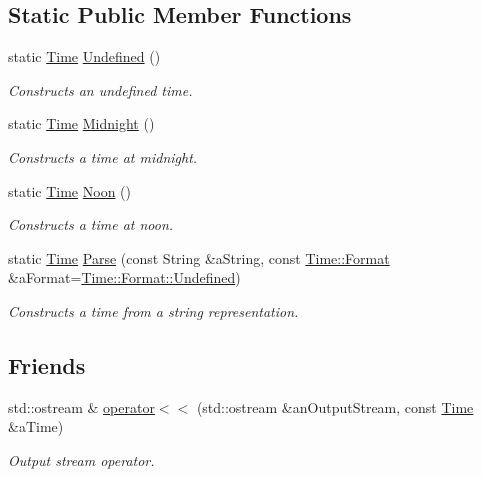 \subsection*{Static Public Member Functions}
\begin{DoxyCompactItemize}
\item 
static \hyperlink{classlibrary_1_1physics_1_1time_1_1_time}{Time} \hyperlink{classlibrary_1_1physics_1_1time_1_1_time_a6e8c7e4ea2d05a7c0a9e5e045ef45520}{Undefined} ()
\begin{DoxyCompactList}\small\item\em Constructs an undefined time. \end{DoxyCompactList}\item 
static \hyperlink{classlibrary_1_1physics_1_1time_1_1_time}{Time} \hyperlink{classlibrary_1_1physics_1_1time_1_1_time_a03dac8a95c9e8f64ef98c5370112b3b8}{Midnight} ()
\begin{DoxyCompactList}\small\item\em Constructs a time at midnight. \end{DoxyCompactList}\item 
static \hyperlink{classlibrary_1_1physics_1_1time_1_1_time}{Time} \hyperlink{classlibrary_1_1physics_1_1time_1_1_time_a3d67891fe71e3b5ba62c6517477e7698}{Noon} ()
\begin{DoxyCompactList}\small\item\em Constructs a time at noon. \end{DoxyCompactList}\item 
static \hyperlink{classlibrary_1_1physics_1_1time_1_1_time}{Time} \hyperlink{classlibrary_1_1physics_1_1time_1_1_time_a0756ad7ca377adc810b7515411657e3b}{Parse} (const String \&a\+String, const \hyperlink{classlibrary_1_1physics_1_1time_1_1_time_a7cfbcbb1d5d0c536e28e61f1e7cbf1c8}{Time\+::\+Format} \&a\+Format=\hyperlink{classlibrary_1_1physics_1_1time_1_1_time_a7cfbcbb1d5d0c536e28e61f1e7cbf1c8aec0fc0100c4fc1ce4eea230c3dc10360}{Time\+::\+Format\+::\+Undefined})
\begin{DoxyCompactList}\small\item\em Constructs a time from a string representation. \end{DoxyCompactList}\end{DoxyCompactItemize}
\subsection*{Friends}
\begin{DoxyCompactItemize}
\item 
std\+::ostream \& \hyperlink{classlibrary_1_1physics_1_1time_1_1_time_a181948621d8fe0d85bdfc97af30b62fb}{operator$<$$<$} (std\+::ostream \&an\+Output\+Stream, const \hyperlink{classlibrary_1_1physics_1_1time_1_1_time}{Time} \&a\+Time)
\begin{DoxyCompactList}\small\item\em Output stream operator. \end{DoxyCompactList}\end{DoxyCompactItemize}


